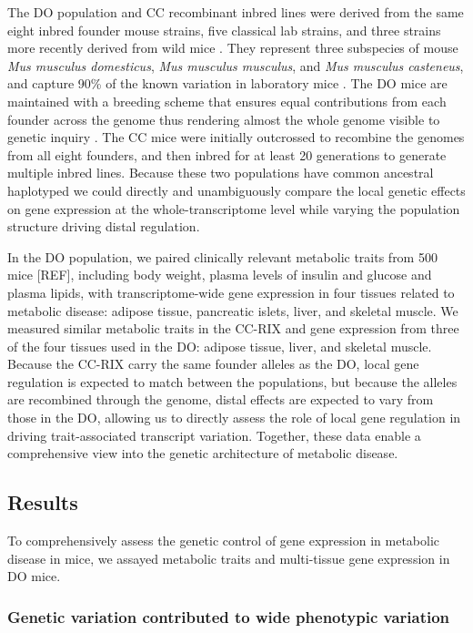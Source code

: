 \documentclass[
]{article}
\begin{document}
The DO population and CC recombinant inbred lines were derived from the
same eight inbred founder mouse strains, five classical lab strains, and
three strains more recently derived from wild mice \cite{pmid22892839}.
They represent three subspecies of mouse
\textit{Mus musculus domesticus}, \textit{Mus musculus musculus}, and
\textit{Mus musculus casteneus}, and capture 90\% of the known variation
in laboratory mice \cite{pmid31133439}. The DO mice are maintained with
a breeding scheme that ensures equal contributions from each founder
across the genome thus rendering almost the whole genome visible to
genetic inquiry \cite{pmid22892839}. The CC mice were initially
outcrossed to recombine the genomes from all eight founders, and then
inbred for at least 20 generations to generate multiple inbred lines.
Because these two populations have common ancestral haplotyped we could
directly and unambiguously compare the local genetic effects on gene
expression at the whole-transcriptome level while varying the population
structure driving distal regulation.

In the DO population, we paired clinically relevant metabolic traits
from 500 mice {[}REF{]}, including body weight, plasma levels of insulin
and glucose and plasma lipids, with transcriptome-wide gene expression
in four tissues related to metabolic disease: adipose tissue, pancreatic
islets, liver, and skeletal muscle. We measured similar metabolic traits
in the CC-RIX and gene expression from three of the four tissues used in
the DO: adipose tissue, liver, and skeletal muscle. Because the CC-RIX
carry the same founder alleles as the DO, local gene regulation is
expected to match between the populations, but because the alleles are
recombined through the genome, distal effects are expected to vary from
those in the DO, allowing us to directly assess the role of local gene
regulation in driving trait-associated transcript variation. Together,
these data enable a comprehensive view into the genetic architecture of
metabolic disease.

\subsection{Results}\label{results}

To comprehensively assess the genetic control of gene expression in
metabolic disease in mice, we assayed metabolic traits and multi-tissue
gene expression in DO mice.

\subsubsection{Genetic variation contributed to wide phenotypic
variation}\label{genetic-variation-contributed-to-wide-phenotypic-variation}
\end{document}
